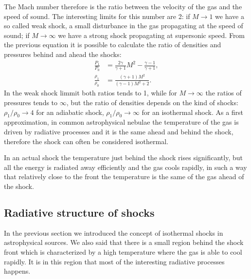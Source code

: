 \documentclass[../main.tex]{subfiles}
\begin{document}
The Mach number therefore is the ratio between the velocity of the gas and the speed of sound.
The interesting limits for this number are 2: if $M\to 1$ we have a so called weak shock, a small disturbance in the gas propagating at the speed of sound; if $M\to\infty$ we have a strong shock propagating at supersonic speed.
From the previous equation it is possible to calculate the ratio of densities and pressures behind and ahead the shocks:
\begin{align}
    \label{eq:ratios1}
    \frac{P_1}{P_0} & = \frac{2\gamma}{\gamma+1}M^2 -\frac{\gamma-1}{\gamma+1},\\
    \label{eq:ratios2}
    \frac{\rho_1}{\rho_0} & = \frac{(\gamma+1)M^2}{(\gamma-1)M^2+2}.
\end{align}
In the weak shock limmit both ratios tends to 1, while for $M\to\infty$ the ratios of pressures tends to $\infty$, but the ratio of densities depends on the kind of shocks: $\rho_1/\rho_0 \to 4$ for an adiabatic shock, $\rho_1/\rho_0 \to \infty$ for an isothermal shock.
As a first approximation, in common astrophysical nebulae the temperature of the gas is driven by radiative processes and it is the same ahead and behind the shock, therefore the shock can often be considered isothermal.

In an actual shock the temperature just behind the shock rises significantly, but all the energy is radiated away efficiently and the gas cools rapidly, in such a way that relatively close to the front the temperature is the same of the gas ahead of the shock.

\subsection{Radiative structure of shocks}

In the previous section we introduced the concept of isothermal shocks in astrophysical sources.
We also said that there is a small region behind the shock front which is characterized by a high temperature where the gas is able to cool rapidly.
It is in this region that most of the interesting radiative processes happens.
\end{document}
